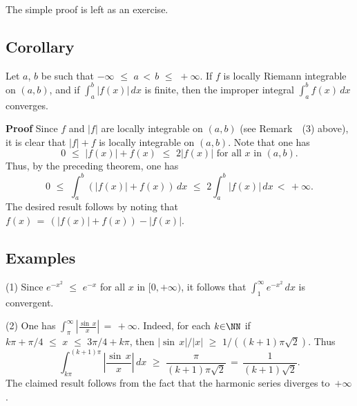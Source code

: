 {\V

        The simple proof is left as an exercise.

\V

        \subsection{\small{{\bf Corollary}}}
        \label{CorH50.100}

\V

        Let $a$, $b$ be such that $-{\infty}\,\,{\leq}\,\,a\,<\,b\,\,{\leq}\,\,+{\infty}$.
    If $f$ is locally Riemann integrable on $(a,b)$, and if ${\displaystyle \int_{a}^{b} |f(x)|\,dx}$ is finite,
    then the improper integral ${\displaystyle \int_{a}^{b} f(x)\,dx}$ converges.

\V

        {\bf Proof} Since $f$ and $|f|$ are locally integrable on $(a,b)$ (see Remark~~(3) above),
    it is clear that $|f| + f$ is locally integrable on $(a,b)$. Note that one has
        \begin{displaymath}
        0\,\,{\leq}\,\,|f(x)| + f(x)\,\,{\leq}\,\,2|f(x)| \mbox{ for all $x$ in $(a,b)$}.
        \end{displaymath}
    Thus, by the preceding theorem, one has
        \begin{displaymath}
        0\,\,{\leq}\,\,\int_{a}^{b} \left(|f(x)| + f(x)\right)\,dx\,\,{\leq}\,\,2\int_{a}^{b} |f(x)|\,dx\,<\,+{\infty}.
        \end{displaymath}
    The desired result follows by noting that $f(x) \,=\, (|f(x)| + f(x)) - |f(x)|$.

\V
\V

        \subsection{\small{{\bf Examples}}}
        \label{ExampH50.110}

\V

\hspace*{\parindent}(1) Since $e^{-x^{2}}\,\,{\leq}\,\,e^{-x}$ for all $x$ in $[0,+{\infty})$, it follows that ${\displaystyle \int_{1}^{{\infty}} e^{-x^{2}}\,dx}$ is convergent.

\V

        (2) One has ${\displaystyle \int_{{\pi}}^{{\infty}} \left|\frac{{\sin}\,x}{x}\right|} \,=\, +{\infty}$.
    Indeed, for each $k{\in}{\NN}$ if $k{\pi} + {\pi}/4\,\,{\leq}\,\,x\,\,{\leq}\,\,3{\pi}/4 + k{\pi}$, then $|{\sin}\,x|/|x|\,\,{\geq}\,\,1/((k+1){\pi}\sqrt{2})$.
 Thus
        \begin{displaymath}
        \int_{k{\pi}}^{(k+1){\pi}} \left|\frac{{\sin}\,x}{x}\right|\,dx\,\,{\geq}\,\,\frac{{\pi}}{(k+1){\pi}\sqrt{2}} \,=\, \frac{1}{(k+1)\sqrt{2}}.
        \end{displaymath}
    The claimed result follows from the fact that the harmonic series diverges to~$+{\infty}$.

}
